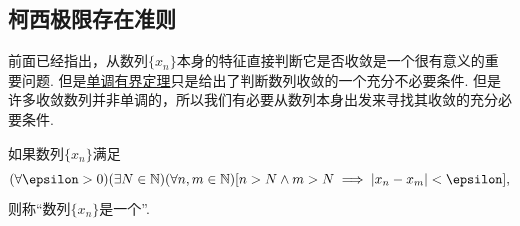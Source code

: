 \subsection{柯西极限存在准则}
前面已经指出，从数列\(\{x_n\}\)本身的特征直接判断它是否收敛是一个很有意义的重要问题.
但是\hyperref[theorem:极限.数列的单调有界定理]{单调有界定理}只是给出了判断数列收敛的一个充分不必要条件.
但是许多收敛数列并非单调的，所以我们有必要从数列本身出发来寻找其收敛的充分必要条件.

\begin{definition}
如果数列\(\{x_n\}\)满足\begin{equation*}
	(\forall\epsilon>0)
	(\exists N\in\mathbb{N})
	(\forall n,m\in\mathbb{N})
	[n > N \land m > N \implies \abs{x_n - x_m} < \epsilon],
\end{equation*}
则称“数列\(\{x_n\}\)是一个”.
\end{definition}

